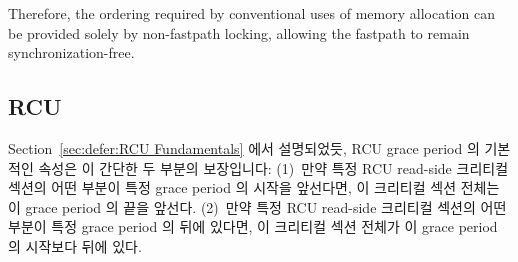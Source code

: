 Therefore, the ordering required by conventional uses of memory allocation
can be provided solely by non-fastpath locking, allowing the fastpath to
remain synchronization-free.
\fi









\subsection{RCU}
\label{sec:memorder:RCU}

Section~\ref{sec:defer:RCU Fundamentals} 에서 설명되었듯, RCU grace period 의
기본적인 속성은 이 간단한 두 부분의 보장입니다:
(1)~만약 특정 RCU read-side 크리티컬 섹션의 어떤 부분이 특정 grace period 의
시작을 앞선다면, 이 크리티컬 섹션 전체는 이 grace period 의 끝을 앞선다.
(2)~만약 특정 RCU read-side 크리티컬 섹션의 어떤 부분이 특정 grace period 의
뒤에 있다면, 이 크리티컬 섹션 전체가 이 grace period 의 시작보다 뒤에 있다.
\iffalse

